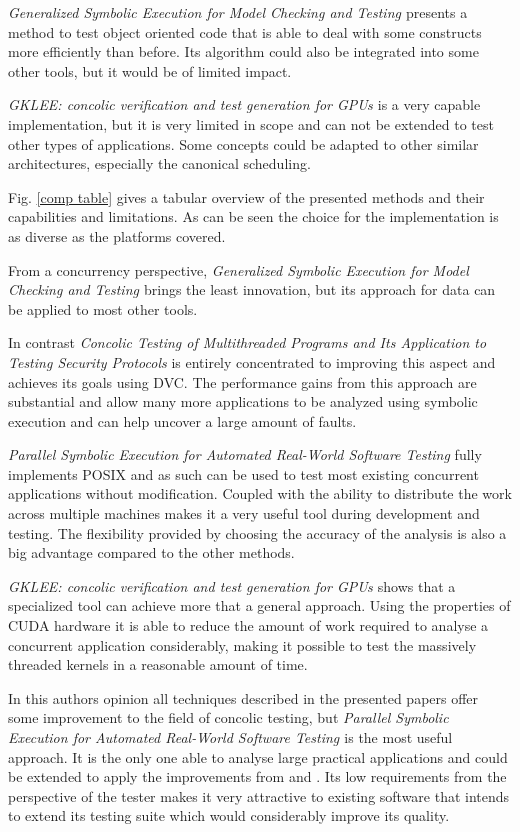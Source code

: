 \documentclass[10pt]{llncs}
\begin{document}
\emph{Generalized Symbolic Execution for Model Checking and Testing \cite{base5}} presents a method to test object oriented code that is able to deal with some constructs more efficiently than before. Its algorithm could also be integrated into some other tools, but it would be of limited impact.

\emph{GKLEE: concolic verification and test generation for GPUs \cite{base7}} is a very capable implementation, but it is very limited in scope and can not be extended to test other types of applications. Some concepts could be adapted to other similar architectures, especially the canonical scheduling.

Fig. \ref{comp table} gives a tabular overview of the presented methods and their capabilities and limitations. As can be seen the choice for the implementation is as diverse as the platforms covered. 

From a concurrency perspective, \emph{Generalized Symbolic Execution for Model Checking and Testing \cite{base5}} brings the least innovation, but its approach for data can be applied to most other tools. 

In contrast \emph{Concolic Testing of Multithreaded Programs and Its Application to Testing Security Protocols} \cite{base4} is entirely concentrated to improving this aspect and achieves its goals using DVC. The performance gains from this approach are substantial and allow many more applications to be analyzed using symbolic execution and can help uncover a large amount of faults.

\emph{Parallel Symbolic Execution for Automated Real-World Software Testing} \cite{base3} fully implements POSIX and as such can be used to test most existing concurrent applications without modification. Coupled with the ability to distribute the work across multiple machines makes it a very useful tool during development and testing. The flexibility provided by choosing the accuracy of the analysis is also a big advantage compared to the other methods.

\emph{GKLEE: concolic verification and test generation for GPUs \cite{base7}} shows that a specialized tool can achieve more that a general approach. Using the properties of CUDA hardware it is able to reduce the amount of work required to analyse a concurrent application considerably, making it possible to test the massively threaded kernels in a reasonable amount of time.

In this authors opinion all techniques described in the presented papers offer some improvement to the field of concolic testing, but \emph{Parallel Symbolic Execution for Automated Real-World Software Testing \cite{base3}} is the most useful approach. It is the only one able to analyse large practical applications and could be extended to apply the improvements from \cite{base4} and \cite{base5}. Its low requirements from the perspective of the tester makes it very attractive to existing software that intends to extend its testing suite which would considerably improve its quality.
\end{document}
